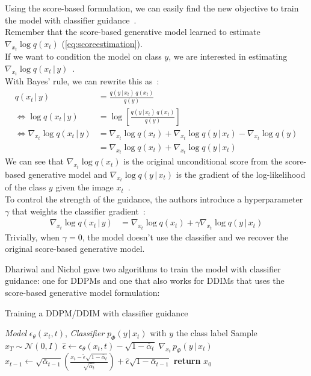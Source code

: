 \documentclass{article}
\numberwithin{equation}{section}
\numberwithin{figure}{section}
\begin{document}
Using the score-based formulation, we can easily find the new objective to train the model with classifier guidance~\cite{luo2022understanding}. \\
Remember that the score-based generative model learned to estimate $\nabla_{x_t} \log q(x_t)$ (\ref{eq:scoreestimation}). \\
If we want to condition the model on class $y$, we are interested in estimating $\nabla_{x_t} \log q(x_t \, | \, y)$~\cite{luo2022understanding}. \\
With Bayes' rule, we can rewrite this as~\cite{luo2022understanding}:
\begin{align}
  q(x_t \, | \, y) &= \frac{q(y \, | \, x_t) \, q(x_t)}{q(y)}\\
  \Leftrightarrow \log q(x_t \, | \, y) &= \log \left[ \frac{q(y \, | \, x_t) \, q(x_t)}{q(y)} \right] \\
  \Leftrightarrow \nabla_{x_t} \log q(x_t \, | \, y) &= \nabla_{x_t} \log q(x_t) + \nabla_{x_t} \log q(y \, | \, x_t) - \nabla_{x_t} \log q(y) \\
  &= \nabla_{x_t} \log q(x_t) + \nabla_{x_t} \log q(y \, | \, x_t)
\end{align}
We can see that $\nabla_{x_t} \log q(x_t)$ is the original unconditional score from the score-based generative model and $\nabla_{x_t} \log q(y \, | \, x_t)$ is the gradient of the log-likelihood of the class $y$ given the image $x_t$~\cite{dhariwal2021diffusion, luo2022understanding}. \\
To control the strength of the guidance, the authors introduce a hyperparameter $\gamma$ that weights the classifier gradient~\cite{dhariwal2021diffusion,luo2022understanding}:
\begin{align}
  \nabla_{x_t} \log q(x_t \, | \, y) &= \nabla_{x_t} \log q(x_t) + \gamma \nabla_{x_t} \log q(y \, | \, x_t) \label{eq:classifier_guidance}
\end{align}
Trivially, when $\gamma = 0$, the model doesn't use the classifier and we recover the original score-based generative model.

Dhariwal and Nichol \cite{dhariwal2021diffusion} gave two algorithms to train the model with classifier guidance: one for DDPMs and one that also works for DDIMs that uses the score-based generative model formulation:
\begin{algorithm}[H]
  \centering
  \caption{Training a DDPM/DDIM with classifier guidance}\label{alg:ddpm_classifier}
  \begin{algorithmic}[1]
    \Require \textit{Model} $\epsilon_\theta (x_t, t)$, \textit{Classifier} $p_\Phi (y \, | \, x_t)$ with $y$ the class label
    \State Sample $x_T \sim \mathcal{N}(0, I)$
      \State $\hat{\epsilon} \leftarrow \epsilon_\theta (x_t, t) - \sqrt{1 - \bar{\alpha}_t} \; \nabla_{x_t} \, p_\Phi (y \, | \, x_t)$
      \State $x_{t-1} \leftarrow \sqrt{\bar{\alpha}_{t-1}} \left( \frac{x_t - \hat{\epsilon} \sqrt{1 - \bar{\alpha}_t}}{\sqrt{\bar{\alpha}_t}} \right) + \hat{\epsilon} \sqrt{1 - \bar{\alpha}_{t-1}}$
    \EndFor
    \State \textbf{return} $x_0$
  \end{algorithmic}
\end{algorithm}
\end{document}

